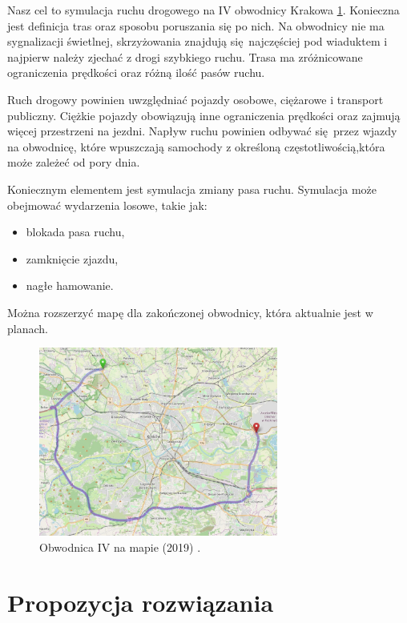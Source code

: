 \documentclass[a4paper,12pt]{article}
\begin{document}
	Nasz cel to symulacja ruchu drogowego na IV obwodnicy Krakowa \ref{obw}. 
	Konieczna jest definicja tras oraz sposobu poruszania się po nich.
	Na obwodnicy nie ma sygnalizacji świetlnej, skrzyżowania znajdują się najczęściej pod wiaduktem i najpierw należy zjechać z drogi szybkiego ruchu.
	Trasa ma zróżnicowane ograniczenia prędkości oraz różną ilość pasów ruchu.
	
	Ruch drogowy powinien uwzględniać pojazdy osobowe, ciężarowe i transport publiczny.
	Ciężkie pojazdy obowiązują inne ograniczenia prędkości oraz zajmują więcej przestrzeni na jezdni.
	Napływ ruchu powinien odbywać się przez wjazdy na obwodnicę, które wpuszczają samochody z określoną częstotliwością,która może zależeć od pory dnia.
	
	Koniecznym elementem jest symulacja zmiany pasa ruchu. 
	Symulacja może obejmować wydarzenia losowe, takie jak:
	
	\begin{itemize}
		\item blokada pasa ruchu,
		\item zamknięcie zjazdu,
		\item nagłe hamowanie.
	\end{itemize}

	Można rozszerzyć mapę dla zakończonej obwodnicy, która aktualnie jest w planach.
	
	\begin{figure}
		\label{obw}
		\centering
		\includegraphics[width=0.7\textwidth]{openstreet.jpg}
		\caption{Obwodnica IV na mapie (2019) \cite{map}.}
	\end{figure}
	
	\section{Propozycja rozwiązania}
		
\end{document}
